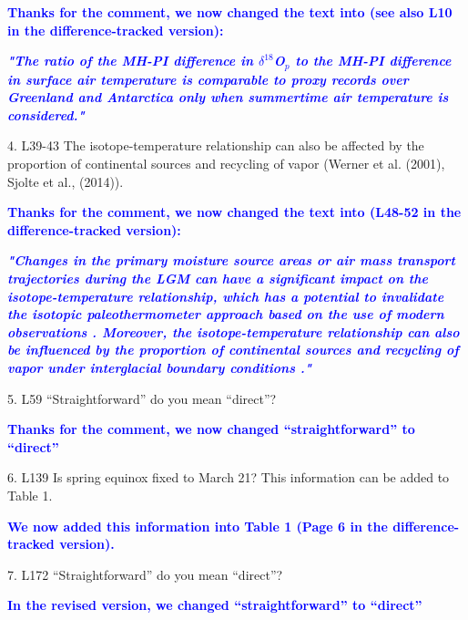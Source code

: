 \documentclass[gmd, manuscript]{copernicus}
\begin{document}
 \medskip
 
\textcolor{blue}{\textbf{Thanks for the comment, we now changed the text into (see also L10 in the difference-tracked version):}}

\textcolor{blue}{\textbf{\textit{"The ratio of the MH-PI difference in $\delta^{18}$O$_p$ to the MH-PI difference in surface air temperature is comparable to proxy records over Greenland and Antarctica only when summertime air temperature is considered."}}}

 \medskip


4. L39-43 The isotope-temperature relationship can also be affected by the proportion of continental sources and recycling of vapor (Werner et al. (2001), Sjolte et al., (2014)).

 \medskip
 
\textcolor{blue}{\textbf{Thanks for the comment, we now changed the text into (L48-52 in the difference-tracked version):}}

\textcolor{blue}{\textbf{\textit{"Changes in the primary moisture source areas or air mass transport trajectories during the LGM can have a significant impact on the isotope-temperature relationship, which has a potential to invalidate the isotopic paleothermometer approach based on the use of modern observations  \citep{delaygue2000origin,werner2001isotopic}.    Moreover, the isotope-temperature relationship can also be influenced by the proportion of continental sources and recycling of vapor under interglacial boundary conditions \citep{sjolte2014modelling}."}}}

 \medskip


5. L59 “Straightforward” do you mean “direct”?

\medskip

\textcolor{blue}{\textbf{Thanks for the comment, we now changed “straightforward” to “direct”}}

\medskip

6. L139 Is spring equinox fixed to March 21? This information can be added to Table 1.

\medskip

\textcolor{blue}{\textbf{We now added this information into Table 1 (Page 6 in the difference-tracked version).}}

\medskip


7. L172 “Straightforward” do you mean “direct”?

\medskip

\textcolor{blue}{\textbf{In the revised version, we changed “straightforward” to “direct”}}
\end{document}
